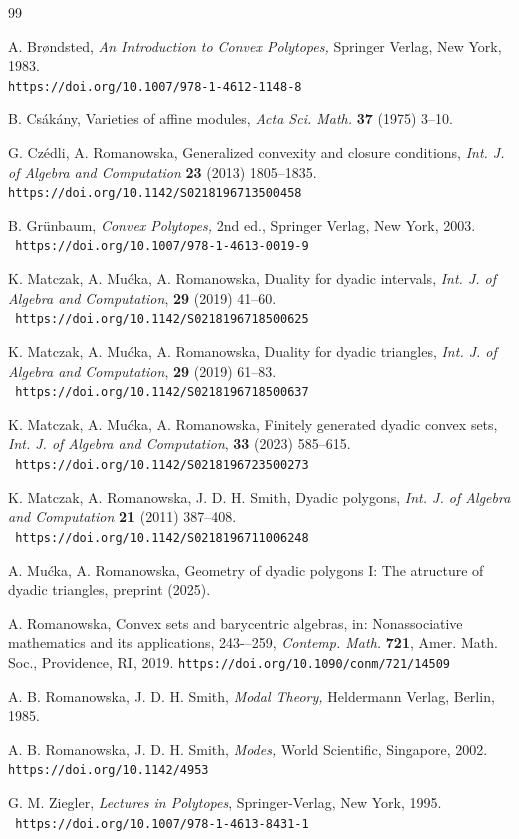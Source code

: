 \documentclass[12pt]{amsart}
\theoremstyle{plain}
\theoremstyle{definition}
\numberwithin{equation}{section}
\begin{document}
\begin{thebibliography}{99}

A. Br\o ndsted,
    {\em An Introduction to Convex Polytopes,}
    Springer Verlag, New York, 1983.\\
\texttt{https://doi.org/10.1007/978-1-4612-1148-8}

B. Cs\'{a}k\'{a}ny,
Varieties of affine modules,
{\em Acta Sci. Math.} {\bf 37} (1975) 3--10.

G. Cz\'{e}dli, A. Romanowska,
Generalized convexity and closure conditions,
{\em Int. J. of Algebra and Computation} {\bf 23} (2013) 1805--1835.
\\ \texttt{https://doi.org/10.1142/S0218196713500458}

B. Gr\"{u}nbaum,
    {\em Convex Polytopes,}
    2nd ed., Springer Verlag, New York, 2003.
\\ \texttt{ https://doi.org/10.1007/978-1-4613-0019-9 }

K. Matczak, A. Mu\'{c}ka, A. Romanowska,
Duality for dyadic intervals,
{\em Int. J. of Algebra and Computation},  {\bf 29} (2019) 41--60.
\\ \texttt{ https://doi.org/10.1142/S0218196718500625 }

K. Matczak, A. Mu\'{c}ka, A. Romanowska,
Duality for dyadic triangles,
{\em Int. J. of Algebra and Computation}, {\bf 29} (2019) 61--83.
\\ \texttt{ https://doi.org/10.1142/S0218196718500637 }

K. Matczak, A. Mu\'{c}ka, A. Romanowska,
Finitely generated dyadic convex sets,
{\em Int. J. of Algebra and Computation}, {\bf 33} (2023) 585--615.
\\ \texttt{ https://doi.org/10.1142/S0218196723500273 }

K. Matczak, A. Romanowska, J. D. H. Smith,
   Dyadic polygons,
   {\em Int. J. of Algebra and Computation} {\bf 21} (2011) 387--408.
\\ \texttt{ https://doi.org/10.1142/S0218196711006248 }

A. Mu\'{c}ka, A. Romanowska,
Geometry of dyadic polygons I: The atructure of dyadic triangles,
preprint (2025).


A. Romanowska,
Convex sets and barycentric algebras,
in: Nonassociative mathematics and its applications, 243-–259, {\em Contemp. Math.} {\bf 721},
Amer. Math. Soc., Providence, RI, 2019.
\texttt{https://doi.org/10.1090/conm/721/14509}


A. B. Romanowska, J. D. H. Smith,
    {\em Modal Theory,}
    Heldermann Verlag, Berlin, 1985.


A. B. Romanowska, J. D. H. Smith,
    {\em Modes,}
    World Scientific, Singapore, 2002.
\texttt{https://doi.org/10.1142/4953}

G. M. Ziegler,
{\em Lectures in Polytopes},
Springer-Verlag, New York, 1995.
\\ \texttt{ https://doi.org/10.1007/978-1-4613-8431-1 }
\end{thebibliography}
\end{document}
